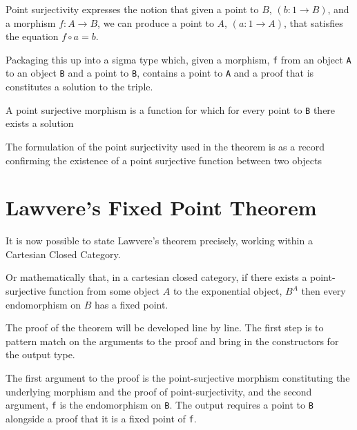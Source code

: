 Point surjectivity expresses the notion that given a point to $B$, $(b : 1
\rightarrow B)$, and a morphism $f : A \rightarrow B$, we can produce a point to
$A$, $(a : 1 \rightarrow A)$, that satisfies the equation $f \circ a = b$.

Packaging this up into a sigma type which, given a morphism, \verb|f| from an object
\verb|A| to
an object \verb|B| and a point to \verb|B|, contains a point to \verb|A| and a proof that is
constitutes a solution to the triple.


A point surjective morphism is a function for which for every point to \verb|B| there
exists a solution


The formulation of the point surjectivity used in the theorem is as a record
confirming the existence of a point surjective function between two objects


\section{Lawvere's Fixed Point Theorem}

It is now possible to state Lawvere's theorem precisely, working within a
Cartesian Closed Category.


Or mathematically that, in a cartesian closed category, if there exists a point-surjective
function from some object $A$ to the exponential object, $B^A$ then every endomorphism on $B$ has a fixed point.

The proof of the theorem will be developed line by line. The first step is to
pattern match on the arguments to the proof and bring in the constructors for
the output type.

\begin{AgdaMultiCode}
\end{AgdaMultiCode}

The first argument to the proof is the point-surjective morphism constituting
the underlying morphism and the proof of point-surjectivity, and the second
argument, \verb|f| is the
endomorphism on \verb|B|. The output requires a point to
\verb|B| alongside a proof that it is a fixed point of \verb|f|.

